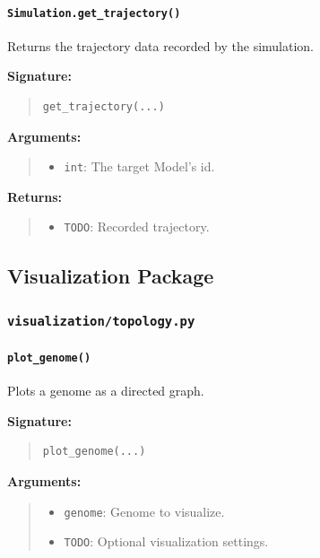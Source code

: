 \documentclass[11pt]{article}
\begin{document}
\paragraph{\texttt{Simulation.get\_trajectory()}}

Returns the trajectory data recorded by the simulation.

\textbf{Signature:}
\begin{quote}
\begin{verbatim}
get_trajectory(...)
\end{verbatim}
\end{quote}

\textbf{Arguments:}
\begin{quote}
\begin{itemize}
    \item \texttt{int}: The target Model's id.
\end{itemize}
\end{quote}

\textbf{Returns:}
\begin{quote}
\begin{itemize}
    \item \texttt{TODO}: Recorded trajectory.
\end{itemize}
\end{quote}

\subsection{Visualization Package}

\subsubsection{\texttt{visualization/topology.py}}

\paragraph{\texttt{plot\_genome()}}

Plots a genome as a directed graph.

\textbf{Signature:}
\begin{quote}
\begin{verbatim}
plot_genome(...)
\end{verbatim}
\end{quote}

\textbf{Arguments:}
\begin{quote}
\begin{itemize}
    \item \texttt{genome}: Genome to visualize.
    \item \texttt{TODO}: Optional visualization settings.
\end{itemize}
\end{quote}
\end{document}
